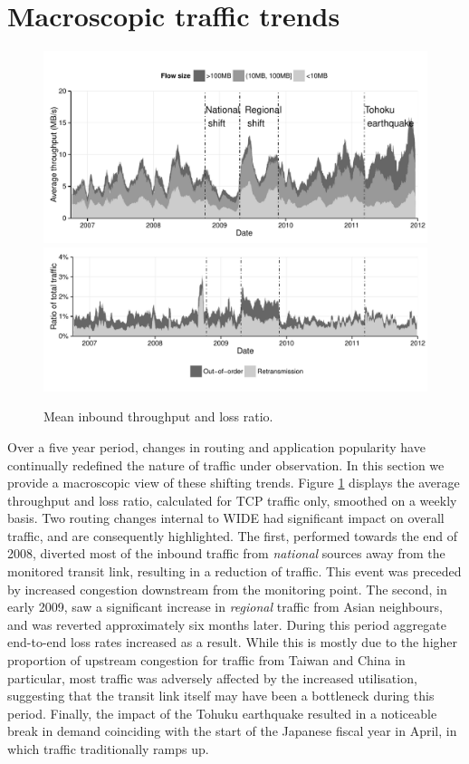 \section{Macroscopic traffic trends}
\label{section:malawi:macro}

\begin{figure}
  \centering
  \includegraphics[width=1.0\textwidth]{figures/malawi/tput}\\
  \includegraphics[width=1.0\textwidth]{figures/malawi/losses}\\
  \caption{Mean inbound throughput and loss ratio.}\label{fig:MAWI}
\end{figure}

Over a five year period, changes in routing and application popularity have continually redefined the nature of traffic under observation.
In this section we provide a macroscopic view of these shifting trends. Figure \ref{fig:MAWI} displays the average throughput and loss ratio, calculated for TCP traffic only, smoothed on a weekly basis. 
Two routing changes internal to WIDE had significant impact on overall traffic, and are consequently highlighted.
The first, performed towards the end of 2008, diverted most of the inbound traffic from \emph{national} sources away from the monitored transit link, resulting in a reduction of traffic.
This event was preceded by increased congestion downstream from the monitoring point.
The second, in early 2009, saw a significant increase in \emph{regional} traffic from Asian neighbours, and was reverted approximately six months later. 
During this period aggregate end-to-end loss rates increased as a result.
While this is mostly due to the higher proportion of upstream congestion for traffic from Taiwan and China in particular, most traffic was adversely affected by the increased utilisation, suggesting that the transit link itself may have been a bottleneck during this period.
Finally, the impact of the Tohuku earthquake resulted in a noticeable break in demand coinciding with the start of the Japanese fiscal year in April, in which traffic traditionally ramps up.


